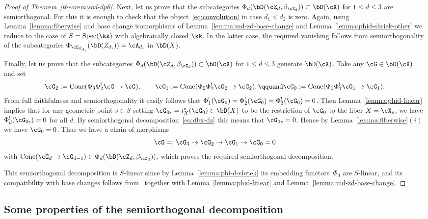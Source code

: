\documentclass[11pt]{amsart}
\DeclareMathOperator{\Spec}{\mathrm{Spec}}
\DeclareMathOperator{\Cone}{\mathrm{Cone}}
\theoremstyle{plain}
\theoremstyle{definition}
\theoremstyle{remark}
\begin{document}
\begin{proof}[Proof of Theorem~\textup{\ref{theorem:sod-dp6}}]
Next, let us prove that the subcategories $\Phi_d(\bD(\cZ_d,\beta_{\cZ_d})) \subset \bD(\cX)$ for $1 \le d \le 3$ are semiorthogonal.
For this it is enough to check that the object~\eqref{eq:convolution} in case $d_1 < d_2$ is zero.
Again, using Lemma~\ref{lemma:fiberwise} and base change isomorphisms of Lemma~\ref{lemma:md-zd-base-change} 
and Lemma~\ref{lemma:phid-shriek-other} we reduce to the case of $S = \Spec(\kk)$ with algebraically closed $\kk$.
In the latter case, the required vanishing follows from semiorthogonality of the subcategories 
$\Phi_{\cE_{Z_{d_i}}}(\bD(Z_{d_i})) = \cA_{d_i}$ in $\bD(X)$.


Finally, let us prove that the subcategories $\Phi_d(\bD(\cZ_d,\beta_{\cZ_d})) \subset \bD(\cX)$ for $1 \le d \le 3$ generate $\bD(\cX)$.
Take any $\cG \in \bD(\cX)$ and set 
\begin{equation*}
\cG_2 := \Cone(\Phi_3\Phi_3^!\cG \to \cG),
\qquad
\cG_1 := \Cone(\Phi_2\Phi_2^!\cG_2 \to \cG_2),
\qquand
\cG_0 := \Cone(\Phi_1\Phi_1^!\cG_1 \to \cG_1).
\end{equation*}
From full faithfulness and semiorthogonality it easily follows that $\Phi_1^!(\cG_0) = \Phi_2^!(\cG_0) = \Phi_3^!(\cG_0) = 0$.
Then Lemma~\ref{lemma:phid-linear} implies that for any geometric point $s \in S$ setting $\cG_{0s} = i_{X}^*(\cG_0) \in \bD(X)$ to be the restriction of $\cG_0$ to the fiber $X = \cX_s$, 
we have $\Phi_d^!(\cG_{0s}) = 0$ for all $d$.
By semiorthogonal decomposition~\eqref{eq:dbx-dz} this means that $\cG_{0s} = 0$.
Hence by Lemma~\ref{lemma:fiberwise}$(i)$ we have $\cG_0 = 0$.
Thus we have a chain of morphisms
\begin{equation*}
\cG =: \cG_3 \to \cG_2 \to \cG_1 \to \cG_0 = 0
\end{equation*}
with $\Cone(\cG_{d} \to \cG_{d-1}) \in \Phi_d(\bD(\cZ_d,\beta_{\cZ_d}))$, which proves the required semiorthogonal decomposition.

This semiorthogonal decomposition is $S$-linear since by Lemma~\ref{lemma:phi-d-shriek} its embedding functors~$\Phi_d$ are $S$-linear,
and its compatibility with base changes follows from~\cite[Theorem~6.4]{kuznetsov2011base} 
together with Lemma~\ref{lemma:phid-linear} and Lemma~\ref{lemma:md-zd-base-change}.
\end{proof}


\subsection{Some properties of the semiorthogonal decomposition}\label{subsection:properties-family}
\end{document}
